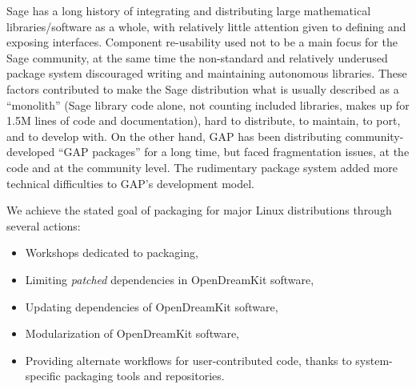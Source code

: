 Sage has a long history of integrating and distributing large
mathematical libraries/software as a whole, with relatively little
attention given to defining and exposing interfaces. Component
re-usability used not to be a main focus for the Sage community, at the
same time the non-standard and relatively underused package system
discouraged writing and maintaining autonomous libraries. These factors
contributed to make the Sage distribution what is usually described as a
``monolith'' (Sage library code alone, not counting included libraries,
makes up for 1.5M lines of code and documentation), hard to distribute,
to maintain, to port, and to develop with. On the other hand, GAP has
been distributing community-developed ``GAP packages'' for a long time,
but faced fragmentation issues, at the code and at the community level.
The rudimentary package system added more technical difficulties to
GAP's development model.

We achieve the stated goal of packaging for major Linux distributions
through several actions:

\begin{itemize}
\tightlist
\item
  Workshops dedicated to packaging,
\item
  Limiting \emph{patched} dependencies in OpenDreamKit software,
\item
  Updating dependencies of OpenDreamKit software,
\item
  Modularization of OpenDreamKit software,
\item
  Providing alternate workflows for user-contributed code, thanks to
  system-specific packaging tools and repositories.
\end{itemize}
